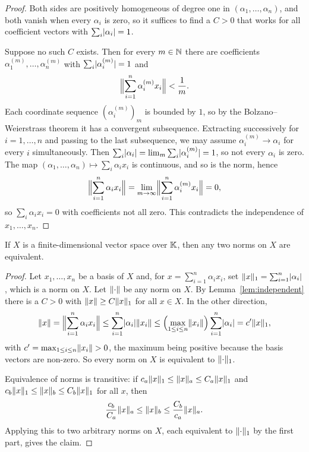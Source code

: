 \begin{proof}
Both sides are positively homogeneous of degree one in $(\alpha_1, \dots,
\alpha_n)$, and both vanish when every $\alpha_i$ is zero, so it suffices to
find a $C > 0$ that works for all coefficient vectors with
$\sum_i \lvert\alpha_i\rvert = 1$.

Suppose no such $C$ exists. Then for every $m \in \mathbb{N}$ there are coefficients
$\alpha^{(m)}_1, \dots, \alpha^{(m)}_n$ with $\sum_i \lvert\alpha^{(m)}_i\rvert = 1$
and
\[
  \Bigl\lVert \sum_{i=1}^{n} \alpha^{(m)}_i x_i \Bigr\rVert < \frac{1}{m}.
\]
Each coordinate sequence $(\alpha^{(m)}_i)_m$ is bounded by $1$, so by the
Bolzano--Weierstrass theorem it has a convergent subsequence. Extracting
successively for $i = 1, \dots, n$ and passing to the last subsequence, we may
assume $\alpha^{(m)}_i \to \alpha_i$ for every $i$ simultaneously. Then
$\sum_i \lvert\alpha_i\rvert = \lim_m \sum_i \lvert\alpha^{(m)}_i\rvert = 1$, so not every
$\alpha_i$ is zero. The map $(\alpha_1, \dots, \alpha_n) \mapsto
\sum_i \alpha_i x_i$ is continuous, and so is the norm, hence
\[
  \Bigl\lVert \sum_{i=1}^{n} \alpha_i x_i \Bigr\rVert
  = \lim_{m \to \infty}
    \Bigl\lVert \sum_{i=1}^{n} \alpha^{(m)}_i x_i \Bigr\rVert = 0,
\]
so $\sum_i \alpha_i x_i = 0$ with coefficients not all zero. This contradicts
the independence of $x_1, \dots, x_n$.
\end{proof}

\begin{theorem}\label{thm:finite-dim}
If $X$ is a finite-dimensional vector space over $\mathbb{K}$, then any two norms on
$X$ are equivalent.
\end{theorem}

\begin{proof}
Let $x_1, \dots, x_n$ be a basis of $X$ and, for
$x = \sum_{i=1}^{n} \alpha_i x_i$, set $\lVert x\rVert_1 = \sum_{i=1}^n
\lvert\alpha_i\rvert$, which is a norm on $X$. Let $\lVert\cdot\rVert$ be any norm on
$X$. By Lemma~\ref{lem:independent} there is a $C > 0$ with
$\lVert x\rVert \ge C \lVert x\rVert_1$ for all $x \in X$. In the other direction,
\[
  \lVert x\rVert = \Bigl\lVert \sum_{i=1}^n \alpha_i x_i \Bigr\rVert
  \le \sum_{i=1}^n \lvert\alpha_i\rvert \lVert x_i\rVert
  \le \Bigl(\max_{1 \le i \le n} \lVert x_i\rVert\Bigr) \sum_{i=1}^n
      \lvert\alpha_i\rvert
  = c' \lVert x\rVert_1 ,
\]
with $c' = \max_{1 \le i \le n} \lVert x_i\rVert > 0$, the maximum being positive
because the basis vectors are non-zero. So every norm on $X$ is equivalent to
$\lVert\cdot\rVert_1$.

Equivalence of norms is transitive: if
$c_a \lVert x\rVert_1 \le \lVert x\rVert_a \le C_a \lVert x\rVert_1$ and
$c_b \lVert x\rVert_1 \le \lVert x\rVert_b \le C_b \lVert x\rVert_1$ for all $x$, then
\[
  \frac{c_b}{C_a} \lVert x\rVert_a \le \lVert x\rVert_b
  \le \frac{C_b}{c_a} \lVert x\rVert_a .
\]
Applying this to two arbitrary norms on $X$, each equivalent to
$\lVert\cdot\rVert_1$ by the first part, gives the claim.
\end{proof}
